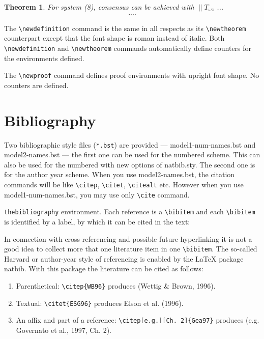 \documentclass[a4paper,fleqn]{cas-dc}
\begin{document}
\newtheorem{theorem}{Theorem}

\begin{theorem}
For system (8), consensus can be achieved with 
$\|T_{\omega z}$ ...
\begin{eqnarray}\label{10}
....
\end{eqnarray}
\end{theorem}

The \verb+\newdefinition+ command is the same in
all respects as its \verb+\newtheorem+ counterpart except that
the font shape is roman instead of italic.  Both
\verb+\newdefinition+ and \verb+\newtheorem+ commands
automatically define counters for the environments defined.

The \verb+\newproof+ command defines proof environments with
upright font shape.  No counters are defined. 


\section{Bibliography}

Two bibliographic style files (\verb+*.bst+) are provided ---
{model1-num-names.bst} and {model2-names.bst} --- the first one can be
used for the numbered scheme. This can also be used for the numbered
with new options of {natbib.sty}. The second one is for the author year
scheme. When  you use model2-names.bst, the citation commands will be
like \verb+\citep+,  \verb+\citet+, \verb+\citealt+ etc. However when
you use model1-num-names.bst, you may use only \verb+\cite+ command.

\verb+thebibliography+ environment.  Each reference is a\linebreak
\verb+\bibitem+ and each \verb+\bibitem+ is identified by a label,
by which it can be cited in the text:

\noindent In connection with cross-referencing and
possible future hyperlinking it is not a good idea to collect
more that one literature item in one \verb+\bibitem+.  The
so-called Harvard or author-year style of referencing is enabled
by the \LaTeX{} package {natbib}. With this package the
literature can be cited as follows:

\begin{enumerate}[\textbullet]
\item Parenthetical: \verb+\citep{WB96}+ produces (Wettig \& Brown, 1996).
\item Textual: \verb+\citet{ESG96}+ produces Elson et al. (1996).
\item An affix and part of a reference:\break
\verb+\citep[e.g.][Ch. 2]{Gea97}+ produces (e.g. Governato et
al., 1997, Ch. 2).
\end{enumerate}
\end{document}
